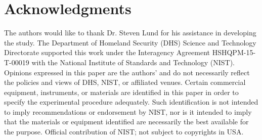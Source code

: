 \documentclass[fleqn,10pt,lineno]{wlpeerj}\usepackage[]{graphicx}\usepackage[]{color}
\begin{document}
\newpage

\section*{Acknowledgments}

The authors would like to thank Dr. Steven Lund for his assistance in developing the study.
The Department of Homeland Security (DHS) Science and Technology Directorate supported this work under the Interagency Agreement HSHQPM-15-T-00019 with the National Institute of Standards and Technology (NIST).
Opinions expressed in this paper are the authors’ and do not necessarily reflect the policies and views of DHS,  NIST, or affiliated venues.
Certain commercial equipment, instruments, or materials are identified in this paper in order to specify the experimental procedure adequately.
Such identification is not intended to imply recommendations or endorsement by NIST,
nor is it intended to imply that the materials or equipment identified are necessarily the best available for the purpose.
Official contribution of NIST; not subject to copyrights in USA.


\end{document}
